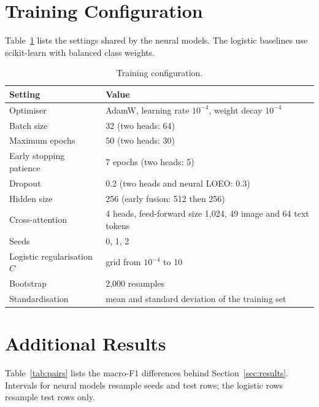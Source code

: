 \documentclass[11pt,a4paper]{article}
\begin{document}
\section{Training Configuration}
\label{app:hyper}
Table~\ref{tab:hyper} lists the settings shared by the neural models.
The logistic baselines use scikit-learn with balanced class weights.

\begin{table}[H]
  \centering
  \small
  \caption{Training configuration.}
  \label{tab:hyper}
  \begin{tabular}{ll}
    \toprule
    Setting & Value \\
    \midrule
    Optimiser & AdamW, learning rate $10^{-4}$, weight decay $10^{-4}$ \\
    Batch size & 32 (two heads: 64) \\
    Maximum epochs & 50 (two heads: 30) \\
    Early stopping patience & 7 epochs (two heads: 5) \\
    Dropout & 0.2 (two heads and neural LOEO: 0.3) \\
    Hidden size & 256 (early fusion: 512 then 256) \\
    Cross-attention & 4 heads, feed-forward size 1,024, 49 image and 64
    text tokens \\
    Seeds & 0, 1, 2 \\
    Logistic regularisation $C$ & grid from $10^{-4}$ to 10 \\
    Bootstrap & 2,000 resamples \\
    Standardisation & mean and standard deviation of the training set \\
    \bottomrule
  \end{tabular}
\end{table}

\section{Additional Results}
\label{app:extra}
Table~\ref{tab:pairs} lists the macro-F1 differences behind
Section~\ref{sec:results}. Intervals for neural models resample seeds and
test rows; the logistic rows resample test rows only.
\end{document}
